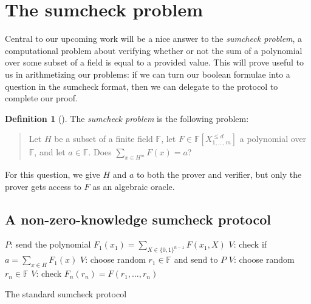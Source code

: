 \documentclass[english]{reedthesis}
\theoremstyle{plain}
\theoremstyle{definition}
\newtheorem{defn}[defn]{Definition}
\theoremstyle{remark}
\begin{document}

\section{The sumcheck problem}

Central to our upcoming work will be a nice answer to the \emph{sumcheck
  problem}, a computational problem about verifying whether or not the sum of a
polynomial over some subset of a field is equal to a provided value. This will
prove useful to us in arithmetizing our problems: if we can turn our boolean
formulae into a question in the sumcheck format, then we can delegate to the
protocol to complete our proof.

\begin{defn}[{\cite{LFKN92}}]\label{def:sumcheck}
  The \emph{sumcheck problem} is the following problem:
  \begin{quote}
    Let $H$ be a subset of a finite field $\mathbb{F}$, let
    $F \in \mathbb{F}[X_{1, \ldots, m}^{\le d}]$ a polynomial over $\mathbb{F}$, and let
    $a \in \mathbb{F}$. Does $\sum_{x \in H^{m}}F(x) = a$?
  \end{quote}
  For this question, we give $H$ and $a$ to both the prover and verifier, but
  only the prover gets access to $F$ as an algebraic oracle.
\end{defn}

\subsection{A non-zero-knowledge sumcheck protocol}

\begin{algorithm}[htbp]
  $P$: send the polynomial $F_{1}(x_{1}) = \sum_{X \in \{0, 1\}^{n-1}}F(x_{1}, X)$\;
  $V$: check if $a = \sum_{x \in H}F_{1}(x)$\;
  $V$: choose random $r_{1} \in \mathbb{F}$ and send to $P$\;
  $V$: choose random $r_{n} \in \mathbb{F}$\;
  $V$: check $F_{n}(r_{n}) = F(r_{1}, \ldots, r_{n})$\;
  \caption{The standard sumcheck protocol~\cite[Thm.\ 1]{LFKN92}}\label{alg:sumcheck-std}
\end{algorithm}
\end{document}
